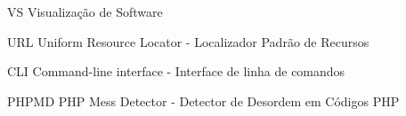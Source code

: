 \begin{siglas}
  \item[VS] Visualização de Software
  \item[URL] Uniform Resource Locator - Localizador Padrão de Recursos
  \item[CLI] Command-line interface - Interface de linha de comandos
  \item[PHPMD] PHP Mess Detector - Detector de Desordem em Códigos PHP
\end{siglas}

